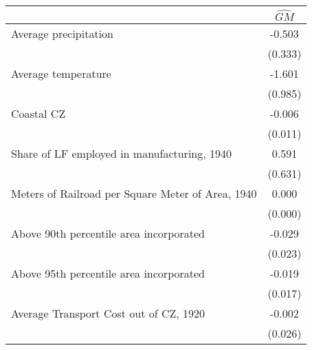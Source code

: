  \begin{tabular}{l*{1}{c}} \toprule
                &\multicolumn{1}{c}{$\widehat{GM}$}\\
\midrule
Average precipitation&   -0.503   \\
                &  (0.333)   \\
\addlinespace
Average temperature&   -1.601   \\
                &  (0.985)   \\
\addlinespace
Coastal CZ      &   -0.006   \\
                &  (0.011)   \\
\addlinespace
Share of LF employed in manufacturing, 1940&    0.591   \\
                &  (0.631)   \\
\addlinespace
Meters of Railroad per Square Meter of Area, 1940&    0.000   \\
                &  (0.000)   \\
\addlinespace
Above 90th percentile area incorporated&   -0.029   \\
                &  (0.023)   \\
\addlinespace
Above 95th percentile area incorporated&   -0.019   \\
                &  (0.017)   \\
\addlinespace
Average Transport Cost out of CZ, 1920&   -0.002   \\
                &  (0.026)   \\
 \bottomrule \end{tabular}
